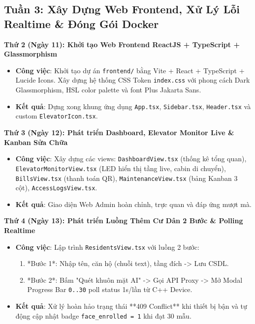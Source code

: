 \documentclass[12pt,a4paper]{article}
\begin{document}
\subsection{Tuần 3: Xây Dựng Web Frontend, Xử Lý Lỗi Realtime \& Đóng Gói Docker}

\begin{daybox}
\textbf{Thứ 2 (Ngày 11): Khởi tạo Web Frontend ReactJS + TypeScript + Glassmorphism}
\begin{itemize}[leftmargin=*]
    \item \textbf{Công việc}: Khởi tạo dự án \texttt{frontend/} bằng Vite + React + TypeScript + Lucide Icons. Xây dựng hệ thống CSS Token \texttt{index.css} với phong cách Dark Glassmorphism, HSL color palette và font Plus Jakarta Sans.
    \item \textbf{Kết quả}: Dựng xong khung ứng dụng \texttt{App.tsx}, \texttt{Sidebar.tsx}, \texttt{Header.tsx} và custom \texttt{ElevatorIcon.tsx}.
\end{itemize}
\end{daybox}

\begin{daybox}
\textbf{Thứ 3 (Ngày 12): Phát triển Dashboard, Elevator Monitor Live \& Kanban Sửa Chữa}
\begin{itemize}[leftmargin=*]
    \item \textbf{Công việc}: Xây dựng các views: \texttt{DashboardView.tsx} (thống kê tổng quan), \texttt{ElevatorMonitorView.tsx} (LED hiển thị tầng live, cabin di chuyển), \texttt{BillsView.tsx} (thanh toán QR), \texttt{MaintenanceView.tsx} (bảng Kanban 3 cột), \texttt{AccessLogsView.tsx}.
    \item \textbf{Kết quả}: Giao diện Web Admin hoàn chỉnh, trực quan và đáp ứng mượt mà.
\end{itemize}
\end{daybox}

\begin{daybox}
\textbf{Thứ 4 (Ngày 13): Phát triển Luồng Thêm Cư Dân 2 Bước \& Polling Realtime}
\begin{itemize}[leftmargin=*]
    \item \textbf{Công việc}: Lập trình \texttt{ResidentsView.tsx} với luồng 2 bước:
    \begin{enumerate}
        \item *Bước 1*: Nhập tên, căn hộ (chuỗi text), tầng đích -> Lưu CSDL.
        \item *Bước 2*: Bấm "Quét khuôn mặt AI" -> Gọi API Proxy -> Mở Modal Progress Bar \texttt{0..30} poll status 1s/lần từ C++ Device.
    \end{enumerate}
    \item \textbf{Kết quả}: Xử lý hoàn hảo trạng thái **409 Conflict** khi thiết bị bận và tự động cập nhật badge \texttt{face\_enrolled = 1} khi đạt 30 mẫu.
\end{itemize}
\end{daybox}
\end{document}
